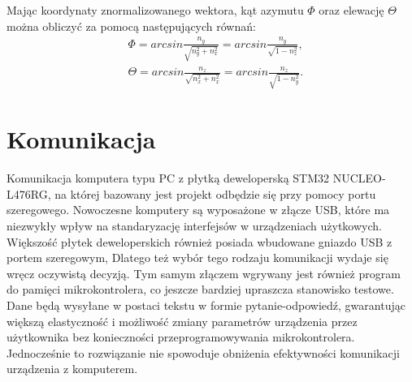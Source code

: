 \clearpage
Mając koordynaty znormalizowanego wektora, kąt azymutu $\Phi$ oraz elewację $\Theta$ można obliczyć za pomocą następujących równań:
\begin{align}
	&\Phi = arcsin \frac{n_y}{\sqrt{n_y^2 +n_x^2}}= arcsin \frac{n_y}{\sqrt{1-n_z^2}},\\
	&\Theta = arcsin \frac{n_z}{\sqrt{n_x^2+n_x^2}}= arcsin \frac{n_z}{\sqrt{1-n_y^2}}.	
\end{align}






\section{Komunikacja}
Komunikacja komputera typu PC z płytką deweloperską STM32 NUCLEO-L476RG, 
na której bazowany jest projekt odbędzie się przy pomocy portu szeregowego. 
Nowoczesne komputery są wyposażone w złącze USB, które ma niezwykły wpływ na standaryzację interfejsów w urządzeniach użytkowych. 
Większość płytek deweloperskich również posiada wbudowane gniazdo USB z portem szeregowym, 
Dlatego też wybór tego rodzaju komunikacji wydaje się wręcz oczywistą decyzją.
Tym samym złączem wgrywany jest również program do pamięci mikrokontrolera, co jeszcze bardziej upraszcza stanowisko testowe.
Dane będą wysyłane w postaci tekstu w formie pytanie-odpowiedź, 
gwarantując większą elastyczność i możliwość zmiany parametrów urządzenia przez użytkownika bez konieczności przeprogramowywania mikrokontrolera.
Jednocześnie to rozwiązanie nie spowoduje obniżenia efektywności komunikacji urządzenia z komputerem. 



